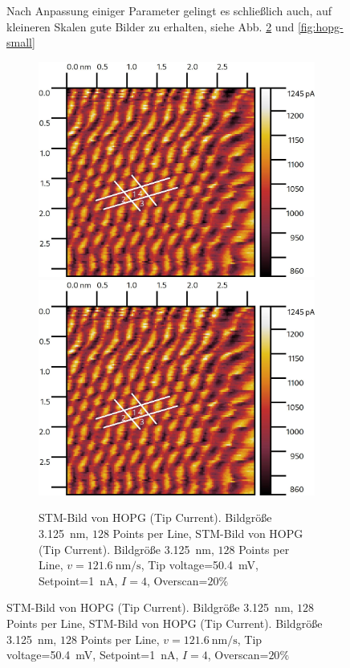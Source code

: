 \documentclass{article}
\begin{document}
\begin{figure}[h]
Nach Anpassung einiger Parameter gelingt es schließlich auch, auf kleineren Skalen gute Bilder zu erhalten, siehe Abb. \ref{fig:hopg-medium} und \ref{fig:hopg-small}
\begin{figure}
    \centering
    \includegraphics[width=0.5\linewidth]{figure/hopg-medium.jpg}
    \includegraphics[width=0.5\linewidth]{figure/hopg-medium.jpg}
    \caption{
        STM-Bild von HOPG (Tip Current). Bildgröße \SI{3.125}{\nm}, $128$ Points per Line,
        STM-Bild von HOPG (Tip Current). Bildgröße \SI{3.125}{\nm}, $128$ Points per Line,
        $v=\SI{121.6}{\nm\per\s}$, Tip voltage=\SI{50.4}{\mV}, Setpoint=\SI{1}{\nA}, $I=4$, Overscan=$20\%$
    }
    \label{fig:hopg-medium}
\end{figure}


\end{figure}
\end{document}
